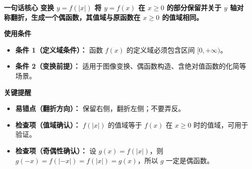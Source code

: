 \clearpage
\begin{summarybox}
	\textbf{\textcolor{CSummary}{一句话核心}}
	\textbf{变换 $y=f(|x|)$ 将 $y=f(x)$ 在 $x\ge 0$ 的部分保留并关于 $y$ 轴对称翻折，生成一个偶函数，其值域与原函数在 $x\ge0$ 的值域相同。}

	\medskip
	\textbf{\textcolor{CSummary}{使用条件}}
	\begin{itemize}[leftmargin=*, itemsep=0.5em, topsep=0.4em]
		\item \textbf{条件 1（定义域条件）：} 函数 $f(x)$ 的定义域必须包含区间 $[0,+\infty)$。
		\item \textbf{条件 2（变换前提）：} 适用于图像变换、偶函数构造、含绝对值函数的化简等场景。
	\end{itemize}

	\medskip
	\textbf{\textcolor{CSummary}{关键提醒}}
	\begin{itemize}[leftmargin=*, itemsep=0.5em, topsep=0.4em]
		\item \textbf{易错点（翻折方向）：} 保留右侧，翻折左侧；不要弄反。
		\item \textbf{检查项（值域确认）：} $f(|x|)$ 的值域等于 $f(x)$ 在 $x\ge0$ 时的值域，可用于验证。
		\item \textbf{检查项（奇偶性确认）：} 设 $g(x)=f(|x|)$，则 $g(-x)=f(|-x|)=f(|x|)=g(x)$，所以 $g$ 一定是偶函数。
	\end{itemize}
\end{summarybox}
